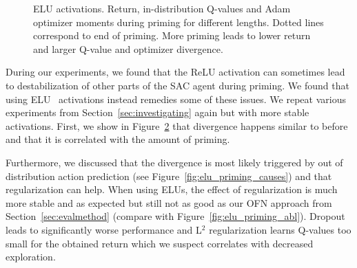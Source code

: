 \begin{figure}[H]
\begin{subfigure}[b]{0.33\textwidth}
        \label{subfig:elu_priming_base_mom}
    \end{subfigure}%
    \vspace{-5pt}
    \caption{ELU activations. Return, in-distribution Q-values and Adam optimizer moments during priming for different lengths. Dotted lines correspond to end of priming. More priming leads to lower return and larger Q-value and optimizer divergence.}
    \label{fig:elu_priming_base}
\end{figure}

During our experiments, we found that the ReLU activation can sometimes lead to destabilization of other parts of the SAC agent during priming. We found that using ELU~\parencite{clevert2016accurate} activations instead remedies some of these issues. We repeat various experiments from Section~\ref{sec:investigating} again but with more stable activations. First, we show in Figure~\ref{fig:elu_priming_base} that divergence happens similar to before and that it is correlated with the amount of priming.

Furthermore, we discussed that the divergence is most likely triggered by out of distribution action prediction (see Figure~\ref{fig:elu_priming_causes}) and that regularization can help. When using ELUs, the effect of regularization is much more stable and as expected but still not as good as our OFN approach from Section~\ref{sec:evalmethod} (compare with Figure~\ref{fig:elu_priming_abl}). Dropout leads to significantly worse performance and L$^2$ regularization learns Q-values too small for the obtained return which we suspect correlates with decreased exploration.

